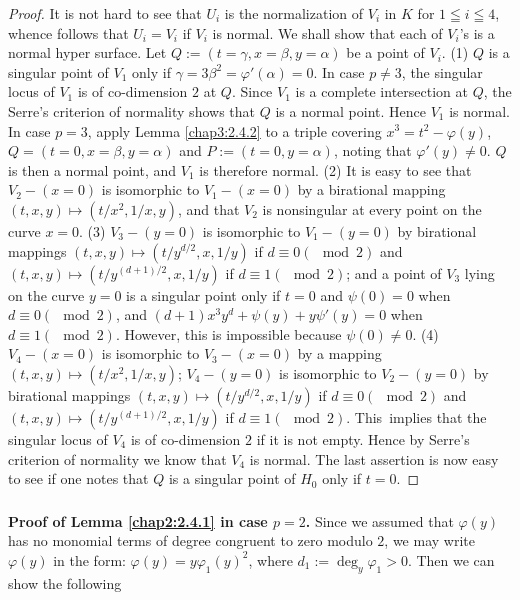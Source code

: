 \begin{proof}
It is not hard to see that $U_{i}$ is the normalization of $V_{i}$ in
$K$ for $1\leqq i\leqq 4$, whence follows that $U_{i}=V_{i}$ if $V_i$ is
normal. We shall show that each of $V_{i}$'s is a normal
hyper surface. Let $Q:=(t=\gamma,x=\beta,y=\alpha)$ be a point of
$V_{i}$. (1) $Q$ is a singular point of $V_{1}$ only if
$\gamma=3\beta^{2}=\varphi'(\alpha)=0$. In case $p\neq 3$, the
singular locus of $V_{1}$ is of co-dimension $2$ at $Q$. Since $V_{1}$
is a complete intersection at $Q$, the Serre's criterion of normality
shows that $Q$ is a normal point. Hence $V_{1}$ is normal. In case
$p=3$, apply Lemma \ref{chap3:2.4.2} to a triple covering
$x^{3}=t^{2}-\varphi(y)$, $Q=(t=0,x=\beta,y=\alpha)$ and
$P:=(t=0,y=\alpha)$, noting that $\varphi'(y)\neq 0$. $Q$ is then a
normal point, and $V_{1}$ is therefore normal. (2) It is easy to see
that $V_{2}-(x=0)$ is isomorphic to $V_{1}-(x=0)$ by a birational
mapping $(t,x,y)\mapsto (t/x^{2},1/x,y)$, and that $V_{2}$ is
nonsingular at every point on the curve $x=0$. (3) $V_{3}-(y=0)$ is
isomorphic to $V_{1}-(y=0)$ by birational mappings $(t,x,y)\mapsto
(t/y^{d/2},x,1/y)$ if $d\equiv 0(\mod 2)$ and $(t,x,y)\mapsto
(t/y^{(d+1)/2},x,1/y)$ if $d\equiv 1(\mod 2)$; and a point of $V_{3}$
lying on the curve $y=0$ is a singular point only if $t=0$ and
$\psi(0)=0$ when $d\equiv 0(\mod 2)$, and
$(d+1)x^{3}y^{d}+\psi(y)+y\psi'(y)=0$ when $d\equiv 1(\mod
2)$. However, this is impossible because $\psi(0)\neq 0$. (4)
$V_{4}-(x=0)$ is isomorphic to $V_{3}-(x=0)$ by a mapping
$(t,x,y)\mapsto (t/x^{2},1/x,y)$; $V_{4}-(y=0)$ is isomorphic to
$V_{2}- (y=0)$ by birational mappings $(t,x,y)\mapsto
(t/y^{d/2},x,1/y)$ if $d\equiv 0(\mod 2)$ and $(t,x,y)\mapsto
(t/y^{(d+1)/2},x,1/y)$ if $d\equiv 1(\mod 2)$. This\pageoriginale\
implies that the singular locus of $V_{4}$ is of co-dimension $2$ if it
is not empty. Hence by Serre's criterion of normality we know that
$V_{4}$ is normal. The last assertion is now easy to see if one notes
that $Q$ is a singular point of $H_{0}$ only if $t=0$.
\end{proof}

\subsubsection{}\label{chap3:2.4.4}
\noindent \textbf{Proof of Lemma \ref{chap2:2.4.1} in case 
 $p=2$.} Since we assumed that $\varphi(y)$ has no monomial
terms of degree congruent to zero modulo $2$, we may write
$\varphi(y)$ in the form: $\varphi(y)=y\varphi_{1}(y)^{2}$, where
$d_{1}:=\deg_{y}\varphi_{1}>0$. Then we can show the following

